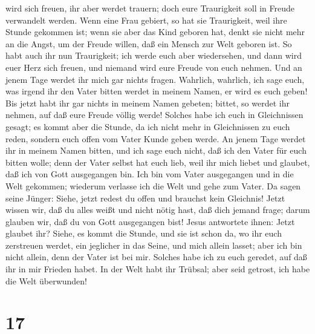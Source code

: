 wird sich freuen, ihr aber werdet trauern; doch eure Traurigkeit soll in
Freude verwandelt werden.  Wenn eine Frau gebiert, so hat
sie Traurigkeit, weil ihre Stunde gekommen ist; wenn sie aber das Kind
geboren hat, denkt sie nicht mehr an die Angst, um der Freude willen,
daß ein Mensch zur Welt geboren ist.  So habt auch ihr
nun Traurigkeit; ich werde euch aber wiedersehen, und dann wird euer
Herz sich freuen, und niemand wird eure Freude von euch nehmen.
 Und an jenem Tage werdet ihr mich gar nichts fragen.
Wahrlich, wahrlich, ich sage euch, was irgend ihr den Vater bitten
werdet in meinem Namen, er wird es euch geben!  Bis jetzt
habt ihr gar nichts in meinem Namen gebeten; bittet, so werdet ihr
nehmen, auf daß eure Freude völlig werde!  Solches habe
ich euch in Gleichnissen gesagt; es kommt aber die Stunde, da ich nicht
mehr in Gleichnissen zu euch reden, sondern euch offen vom Vater Kunde
geben werde.  An jenem Tage werdet ihr in meinem Namen
bitten, und ich sage euch nicht, daß ich den Vater für euch bitten
wolle;  denn der Vater selbst hat euch lieb, weil ihr
mich liebet und glaubet, daß ich von Gott ausgegangen bin.
 Ich bin vom Vater ausgegangen und in die Welt gekommen;
wiederum verlasse ich die Welt und gehe zum Vater.  Da
sagen seine Jünger: Siehe, jetzt redest du offen und brauchst kein
Gleichnis!  Jetzt wissen wir, daß du alles weißt und
nicht nötig hast, daß dich jemand frage; darum glauben wir, daß du von
Gott ausgegangen bist!  Jesus antwortete ihnen: Jetzt
glaubet ihr?  Siehe, es kommt die Stunde, und sie ist
schon da, wo ihr euch zerstreuen werdet, ein jeglicher in das Seine, und
mich allein lasset; aber ich bin nicht allein, denn der Vater ist bei
mir.  Solches habe ich zu euch geredet, auf daß ihr in
mir Frieden habet. In der Welt habt ihr Trübsal; aber seid getrost, ich
habe die Welt überwunden!

\hypertarget{section-16}{%
\section{17}\label{section-16}}

